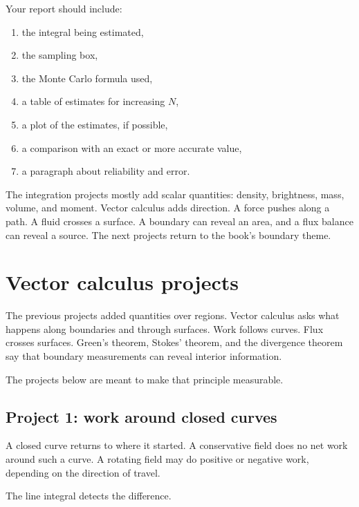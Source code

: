 Your report should include:

\begin{enumerate}
\item the integral being estimated,

\item the sampling box,

\item the Monte Carlo formula used,

\item a table of estimates for increasing \(N\),

\item a plot of the estimates, if possible,

\item a comparison with an exact or more accurate value,

\item a paragraph about reliability and error.
\end{enumerate}

The integration projects mostly add scalar quantities: density, brightness, mass,
volume, and moment.  Vector calculus adds direction.  A force pushes along a path.  A
fluid crosses a surface.  A boundary can reveal an area, and a flux balance can reveal a
source.  The next projects return to the book's boundary theme.

\section{Vector calculus projects}
\label{sec:20.4}

The previous projects added quantities over regions.  Vector calculus asks what happens
along boundaries and through surfaces.  Work follows curves.  Flux crosses surfaces.
Green's theorem, Stokes' theorem, and the divergence theorem say that boundary
measurements can reveal interior information.

The projects below are meant to make that principle measurable.

\subsection{Project 1: work around closed curves}

A closed curve returns to where it started.  A conservative field does no net work
around such a curve.  A rotating field may do positive or negative work, depending on
the direction of travel.

The line integral detects the difference.

